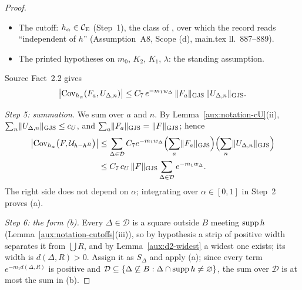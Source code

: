 \begin{proof}
\begin{itemize}
  squares of $F_a$, which lie in $\bigcup R$; its width is $w_\Delta>0$ and its orientation is the
  one assigned.  Its two closed half-planes are disjoint because $w_\Delta>0$
  (Definition~\ref{aux:notation-stripdef}), so the localization squares of $F_a$ and $\Delta$ are
  disjoint, even as closed squares.  If $S_\Delta$ is transverse and $F_a$ is of type (1.1.5),
  this is the transverse case of F-T (\S\ref{sec:purpose}).
\item The cutoff: $h_\alpha\in\mathcal{C}_{\mathrm E}$ (Step~1), the class of \cite[p.~589]{GJS}, over which the
  record reads ``independent of $h$'' (Assumption~A8, Scope (d), main.tex ll.~887--889).
\item The printed hypotheses on $m_0$, $K_2$, $K_1$, $\lambda$: the standing assumption.
\end{itemize}
Source Fact~2.2 gives
\[
 \bigl|\operatorname{Cov}_{h_\alpha}(F_a,U_{\Delta,n})\bigr|\le C_7\,e^{-m_1w_\Delta}\,
 \lVert F_a\rVert_{\mathrm{GJS}}\,\lVert U_{\Delta,n}\rVert_{\mathrm{GJS}} .
\]

\emph{Step 5: summation.}  We sum over $a$ and $n$.  By Lemma~\ref{aux:notation-cU}(ii),
$\sum_n\lVert U_{\Delta,n}\rVert_{\mathrm{GJS}}\le c_U$, and $\sum_a\lVert F_a\rVert_{\mathrm{GJS}}=\lVert F\rVert_{\mathrm{GJS}}$; hence
\begin{align*}
 \bigl|\operatorname{Cov}_{h_\alpha}\bigl(F,\mathcal U_{h-h^B}\bigr)\bigr|
 &\le\sum_{\Delta\in\mathcal D}C_7e^{-m_1w_\Delta}
   \Bigl(\sum_a\lVert F_a\rVert_{\mathrm{GJS}}\Bigr)\Bigl(\sum_n\lVert U_{\Delta,n}\rVert_{\mathrm{GJS}}\Bigr)\\
 &\le C_7\,c_U\,\lVert F\rVert_{\mathrm{GJS}}\sum_{\Delta\in\mathcal D}e^{-m_1w_\Delta} .
\end{align*}
The right side does not depend on $\alpha$; integrating over $\alpha\in[0,1]$ in Step~2 proves
(a).

\emph{Step 6: the form (b).}  Every $\Delta\in\mathcal D$ is a square outside $B$ meeting $\operatorname{supp} h$
(Lemma~\ref{aux:notation-cutoffs}(iii)), so by hypothesis a strip of positive width separates it
from $\bigcup R$, and by Lemma~\ref{aux:d2-widest} a widest one exists; its width is
$d(\Delta,R)>0$.  Assign it as $S_\Delta$ and apply (a); since every term
$e^{-m_1d(\Delta,R)}$ is positive and
$\mathcal D\subseteq\{\Delta\not\subseteq B:\Delta\cap\operatorname{supp} h\ne\varnothing\}$, the sum over
$\mathcal D$ is at most the sum in (b).
\end{proof}

